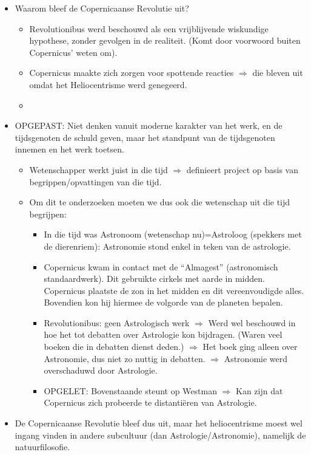 \documentclass{article}
\begin{document}
\begin{itemize}
\begin{itemize}
\begin{itemize}
        \end{itemize}
      \end{itemize}
      \item Waarom bleef de Copernicaanse Revolutie uit? 
      \begin{itemize}
        \item Revolutionibus werd beschouwd als een vrijblijvende wiskundige hypothese, zonder gevolgen in de realiteit. (Komt door voorwoord buiten Copernicus' weten om).
        \item Copernicus maakte zich zorgen voor spottende reacties $\Rightarrow$ die bleven uit omdat het Heliocentrisme werd genegeerd.
        \item 
      \end{itemize}
      \item OPGEPAST: Niet denken vanuit moderne karakter van het werk, en de tijdsgenoten de schuld geven, maar het standpunt van de tijdsgenoten innemen en het werk toetsen.
      \begin{itemize}
        \item Wetenschapper werkt juist in die tijd $\Rightarrow$ definieert project op basis van begrippen/opvattingen van die tijd.
        \item Om dit te onderzoeken moeten we dus ook die wetenschap uit die tijd begrijpen:
        \begin{itemize}
          \item In die tijd was Astronoom (wetenschap nu)=Astroloog (spekkers met de dierenriem): Astronomie stond enkel in teken van de astrologie.
          \item Copernicus kwam in contact met de ``Almagest'' (astronomisch standaardwerk). Dit gebruikte cirkels met aarde in midden. Copernicus plaatste de zon in het midden en dit vereenvoudigde alles. Bovendien kon hij hiermee de volgorde van de planeten bepalen.
          \item Revolutionibus: geen Astrologisch werk $\Rightarrow$ Werd wel beschouwd in hoe het tot debatten over Astrologie kon bijdragen. (Waren veel boeken die in debatten dienst deden.) $\Rightarrow$ Het boek ging alleen over Astronomie, dus niet zo nuttig in debatten. $\Rightarrow$ Astronomie werd overschaduwd door Astrologie.
          \item OPGELET: Bovenstaande steunt op Westman $\Rightarrow$ Kan zijn dat Copernicus zich probeerde te distanti\"eren van Astrologie.
        \end{itemize}
      \end{itemize}
      \item De Copernicaanse Revolutie bleef dus uit, maar het heliocentrisme moest wel ingang vinden in andere subcultuur (dan Astrologie/Astronomie), namelijk de natuurfilosofie.
    \end{itemize}
\end{document}
